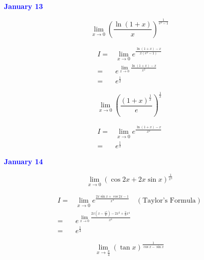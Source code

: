 \textcolor{blue}{\textbf{January 13}}

\begin{example}[][Exam: 27.2.11]
	$$\lim\limits_{x\to 0}\left( \dfrac{\ln(1+x)}{x}\right)^{\frac{1}{e^{x}-1}}$$
\end{example}

\begin{solution}

	\begin{align*}
		I = & \lim\limits_{x\to 0}e^{\frac{\ln(1+x)-x}{x(e^{x}-1)}}\\
		  = & e^{\lim\limits_{x\to 0}\frac{\ln(1+x)-x}{x^{2}}}\\
		  = & e^{\frac{1}{2}}
	\end{align*}
\end{solution}

\begin{example}[][Exam: 27.2.12]
	$$\lim\limits_{x\to 0}\left( \dfrac{(1+x)^{\frac{1}{x}}}{e}\right)^{\frac{1}{x}}$$
\end{example}

\begin{solution}

	\begin{align*}
		I = & \lim\limits_{x\to 0}e^{\frac{\ln(1+x)-x}{x^{2}}}\\
		  = & e^{\frac{1}{2}}
	\end{align*}
\end{solution}

\textcolor{blue}{\textbf{January 14}}

\begin{example}[][Exam: 27.2.13]
	$$\lim\limits_{x\to 0}(\cos 2x+2x\sin x)^{\frac{1}{x^{4}}}$$
\end{example}

\begin{solution}

	\begin{align*}
		I = & \lim\limits_{x\to 0}e^{\frac{2x\sin x+\cos 2x-1}{x^{4}}}\quad (\text{Taylor's Formula})\\
		  = & e^{\lim\limits_{x\to 0}\frac{2x(x-\frac{x^{3}}{6})-2x^{2}+\frac{2}{3}x^{4}}{x^{4}}}\\
		  = & e^{\frac{1}{3}}
	\end{align*}
\end{solution}

\begin{example}[][Exam: 27.2.14]
	 $$\lim\limits_{x\to \frac{\pi}{4}}\left( \tan x\right) ^{\frac{1}{\cos x-\sin x}}$$
\end{example}

